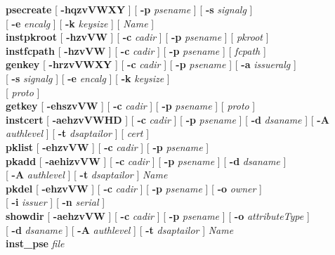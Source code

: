 {\bf psecreate} [ {\bf -hqzvVWXY} ] [ {\bf -p} {\em psename} ] [ {\bf -s} {\em signalg} ] 
             \\ \hspace*{1.5cm} [ {\bf -e} {\em encalg} ] [ {\bf -k} {\em keysize} ] [ {\em Name} ] \\ 
{\bf instpkroot} [ {\bf -hzvVW} ] [ {\bf -c} {\em cadir} ] [ {\bf -p} {\em psename} ] [ {\em pkroot} ] \\
{\bf instfcpath} [ {\bf -hzvVW} ] [ {\bf -c} {\em cadir} ] [ {\bf -p} {\em psename} ] [ {\em fcpath} ] \\
{\bf genkey} [ {\bf -hrzvVWXY} ] [ {\bf -c} {\em cadir} ] [ {\bf -p} {\em psename} ] [ {\bf -a} {\em issueralg} ] \\
\hspace*{1.6cm} [ {\bf -s} {\em signalg} ] [ {\bf -e} {\em encalg} ] [ {\bf -k} {\em keysize} ] \\ 
\hspace*{1.6cm} [ {\em proto} ] \\
{\bf getkey} [ {\bf -ehszvVW} ] [ {\bf -c} {\em cadir} ] [ {\bf -p} {\em psename} ] [ {\em proto} ] 
\\
{\bf instcert} [ {\bf -aehzvVWHD} ] [ {\bf -c} {\em cadir} ] [ {\bf -p} {\em psename} ] [ {\bf -d} {\em dsaname} ] [ {\bf -A} {\em authlevel} ] [ {\bf -t} {\em dsaptailor} ] [ {\em cert} ] \\
{\bf pklist} [ {\bf -ehzvVW} ] [ {\bf -c} {\em cadir} ] [ {\bf -p} {\em psename} ] \\
{\bf pkadd} [ {\bf -aehizvVW} ] [ {\bf -c} {\em cadir} ] [ {\bf -p} {\em psename} ] [ {\bf -d} {\em dsaname} ] \\
\hspace*{1.6cm} [ {\bf -A} {\em authlevel} ] [ {\bf -t} {\em dsaptailor} ] {\em Name} \\
{\bf pkdel} [ {\bf -ehzvVW} ] [ {\bf -c} {\em cadir} ] [ {\bf -p} {\em psename} ] [ {\bf -o} {\em owner} ] \\
\hspace*{1.6cm} [ {\bf -i} {\em issuer} ] [ {\bf -n} {\em serial} ] \\
{\bf showdir} [ {\bf -aehzvVW} ] [ {\bf -c} {\em cadir} ] [ {\bf -p} {\em psename} ] [ {\bf -o} {\em attributeType} ] \\ \hspace*{1.6cm} [ {\bf -d} {\em dsaname} ] [ {\bf -A} {\em authlevel} ] [ {\bf -t} {\em dsaptailor} ] {\em Name} \\
{\bf inst\_pse} {\em file} \\
